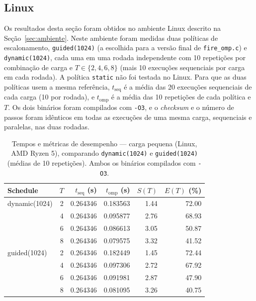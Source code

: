 \documentclass[12pt,a4paper]{article}
\begin{document}
\subsection{Linux}\label{sec:linux}
Os resultados desta seção foram obtidos no ambiente Linux descrito na
Seção~\ref{sec:ambiente}. Neste ambiente foram medidas duas políticas de
escalonamento, \texttt{guided(1024)} (a escolhida para a versão final de
\texttt{fire\_omp.c}) e \texttt{dynamic(1024)}, cada uma em uma rodada
independente com 10 repetições por combinação de carga e
$T\in\{2,4,6,8\}$ (mais 10 execuções sequenciais por carga em cada
rodada). A política \texttt{static} não foi testada no Linux. Para que as
duas políticas usem a mesma referência, $t_{\mathrm{seq}}$ é a média das
20 execuções sequenciais de cada carga (10 por rodada), e
$t_{\mathrm{omp}}$ é a média das 10 repetições de cada política e $T$.
Os dois binários foram compilados com \texttt{-O3}, e o \emph{checksum} e
o número de passos foram idênticos em todas as execuções de uma mesma
carga, sequenciais e paralelas, nas duas rodadas.

\begin{table}[H]
\centering\small
\caption{Tempos e métricas de desempenho --- carga pequena (Linux, AMD Ryzen 5), comparando \texttt{dynamic(1024)} e \texttt{guided(1024)} (médias de 10 repetições). Ambos os binários compilados com \texttt{-O3}.}
\begin{tabular}{lrrrrr}
\toprule
\textbf{Schedule} & $T$ & $t_{\mathrm{seq}}$ (s) & $t_{\mathrm{omp}}$ (s) & $S(T)$ & $E(T)$ (\%) \\
\midrule
dynamic(1024) & 2 & 0.264346 & 0.183563 & 1.44 & 72.00 \\
              & 4 & 0.264346 & 0.095877 & 2.76 & 68.93 \\
              & 6 & 0.264346 & 0.086613 & 3.05 & 50.87 \\
              & 8 & 0.264346 & 0.079575 & 3.32 & 41.52 \\
\midrule
guided(1024)  & 2 & 0.264346 & 0.182449 & 1.45 & 72.44 \\
              & 4 & 0.264346 & 0.097306 & 2.72 & 67.92 \\
              & 6 & 0.264346 & 0.091981 & 2.87 & 47.90 \\
              & 8 & 0.264346 & 0.081095 & 3.26 & 40.75 \\
\bottomrule
\end{tabular}
\end{table}
\end{document}
